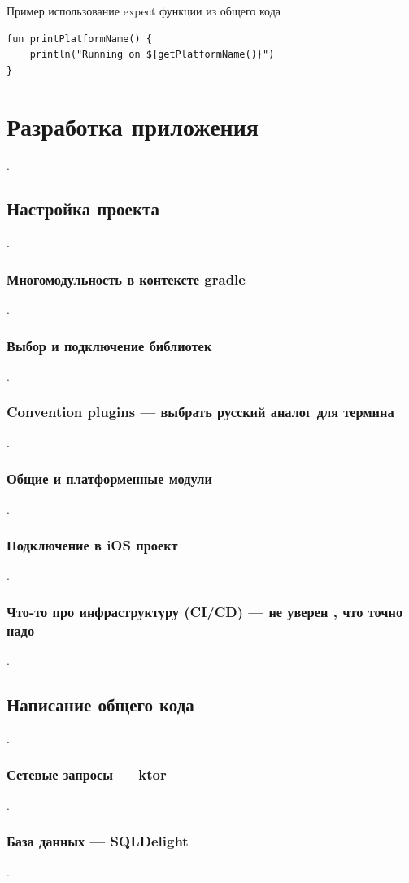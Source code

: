 \documentclass[14pt, russian]{scrartcl}
\begin{document}
\begin{listing}[!h]
\caption{Пример использование expect функции из общего кода}
\label{lst:expect_usage}
\begin{verbatim}
fun printPlatformName() {
    println("Running on ${getPlatformName()}")
}
\end{verbatim}
\end{listing}

\section{Разработка приложения}
.
\subsection{Настройка проекта}
.
\subsubsection{Многомодульность в контексте gradle}
.
\subsubsection{Выбор и подключение библиотек}
.
\subsubsection{Convention plugins --- выбрать русский аналог для термина}
.
\subsubsection{Общие и платформенные модули}
.
\subsubsection{Подключение в iOS проект}
.
\subsubsection{Что-то про инфраструктуру (CI/CD) --- не уверен , что точно надо}
.
\subsection{Написание общего кода}
.
\subsubsection{Сетевые запросы --- ktor}
.
\subsubsection{База данных --- SQLDelight}
.
\end{document}
